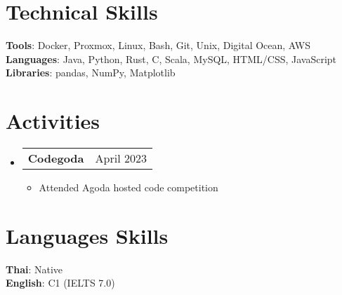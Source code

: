 \documentclass[letterpaper,11pt]{article}
\makeatletter
\newcommand{\resumeItem}[1]{
  \item\small{
    {#1 \vspace{-2pt}}
  }
}
\newcommand{\resumeProjectHeading}[2]{
    \item
    \begin{tabular*}{0.97\textwidth}{l@{\extracolsep{\fill}}r}
      \small#1 & #2 \\
    \end{tabular*}\vspace{-7pt}
}
\newcommand{\resumeSubHeadingListStart}{\begin{itemize}[leftmargin=0.15in, label={}]}
\newcommand{\resumeSubHeadingListEnd}{\end{itemize}}
\newcommand{\resumeItemListStart}{\begin{itemize}}
\newcommand{\resumeItemListEnd}{\end{itemize}\vspace{-5pt}}
\makeatother
\begin{document}
\section{Technical Skills}
 \begin{itemize}[leftmargin=0.15in, label={}]
    \small{\item{
     \textbf{Tools}{: Docker, Proxmox, Linux, Bash, Git, Unix, Digital Ocean, AWS} \\
     \textbf{Languages}{: Java, Python, Rust, C, Scala, MySQL, HTML/CSS, JavaScript} \\
     \textbf{Libraries}{: pandas, NumPy, Matplotlib}
    }}
 \end{itemize}

\section{Activities}
    \resumeSubHeadingListStart
      \resumeProjectHeading
        {\textbf{Codegoda}}{April 2023}
        \resumeItemListStart
          \resumeItem{Attended Agoda hosted code competition}
        \resumeItemListEnd
    \resumeSubHeadingListEnd

\section{Languages Skills}
 \begin{itemize}[leftmargin=0.15in, label={}]
    \small{\item{
     \textbf{Thai}{: Native} \\
     \textbf{English}{: C1 (IELTS 7.0)} \\
    }}
 \end{itemize}


\end{document}
